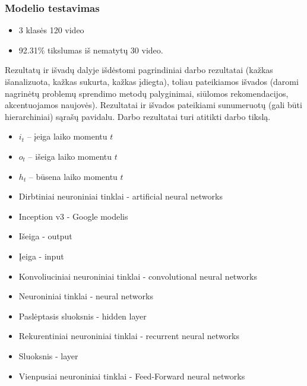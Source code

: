 \documentclass{VUMIFPSbakalaurinis}
\begin{document}
\subsubsection{Modelio testavimas}

\begin{itemize}
	\item 3 klasės 120 video
	\item 92.31\% tikslumas iš nematytų 30 video.
\end{itemize}

Rezultatų ir išvadų dalyje išdėstomi pagrindiniai darbo rezultatai (kažkas
išanalizuota, kažkas sukurta, kažkas įdiegta), toliau pateikiamos išvados
(daromi nagrinėtų problemų sprendimo metodų palyginimai, siūlomos
rekomendacijos, akcentuojamos naujovės). Rezultatai ir išvados pateikiami
sunumeruotų (gali būti hierarchiniai) sąrašų pavidalu. Darbo rezultatai turi
atitikti darbo tikslą.

\printbibliography[heading=bibintoc]  %


\begin{itemize}
	\item $i_t$ – įeiga laiko momentu $t$
	\item $o_t$ – išeiga laiko momentu $t$
	\item $h_t$ – būsena laiko momentu $t$
\end{itemize}



\begin{itemize}
	\item Dirbtiniai neuroniniai tinklai - artificial neural networks
	\item Inception v3 - Google modelis
	\item Išeiga - output
	\item Įeiga - input
	\item Konvoliuciniai neuroniniai tinklai - convolutional neural networks
	\item Neuroniniai tinklai - neural networks
	\item Paslėptasis sluoksnis - hidden layer
	\item Rekurentiniai neuroniniai tinklai - recurrent neural networks
	\item Sluoksnis - layer
	\item Vienpusiai neuroniniai tinklai - Feed-Forward neural networks
\end{itemize}
\end{document}
